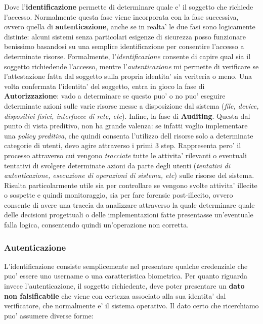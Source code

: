 Dove l'\textbf{identificazione} permette di determinare quale e' il soggetto che richiede l'accesso. Normalmente questa fase viene incorporata con la fase successiva, ovvero quella di \textbf{autenticazione}, anche se in realta' le due fasi sono logicamente distinte: alcuni sistemi senza particolari esigenze di sicurezza posso funzionare benissimo basandosi su una semplice identificazione per consentire l'accesso a determinate risorse. Formalmente, l'\emph{identificazione} consente di capire qual sia il soggetto richiedende l'accesso, mentre l'\emph{autenticazione} mi permette di verificare se l'attestazione fatta dal soggetto sulla propria identita' sia veriteria o meno. Una volta confermata l'identita' del soggetto, entra in gioco la fase di \textbf{Autorizzazione}: vado a determinare se questo puo' o no puo' eseguire determinate azioni sulle varie risorse messe a disposizione dal sistema (\emph{file, device, dispositivi fisici, interfacce di rete, etc}). 
Infine, la fase di \textbf{Auditing}. Questa dal punto di vista preditivo, non ha grande valenza: se infatti voglio implementare una \emph{policy preditiva}, che quindi consenta l'utilizzo dell risorse solo a determinate categorie di utenti, devo agire attraverso i primi 3 step. Rappresenta pero' il processo attraverso cui vengono \emph{tracciate} tutte le attivita' rilevanti o eventuali tentativi di svolgere determinate azioni da parte degli utenti (\emph{tentativi di autenticazione, esecuzione di operazioni di sistema, etc}) sulle risorse del sistema. Risulta particolarmente utile sia per controllare se vengono svolte attivita' illecite o sospette e quindi monitoraggio, sia per fare forensic post-illecito, ovvero consente di avere una traccia da analizzare attraverso la quale determinare quale delle decisioni progettuali o delle implementazioni fatte presentasse un'eventuale falla logica, consentendo quindi un'operazione non corretta.

\subsubsection{Autenticazione}
L'identificazione consiste semplicemente nel presentare qualche credenziale che puo' essere uno username o una caratteristica biometrica. Per quanto riguarda invece l'autenticazione, il soggetto richiedente, deve poter presentare un \textbf{dato non falsificabile} che viene con certezza associato alla sua identita' dal verificatore, che normalmente e' il sistema operativo. 
Il dato certo che ricerchiamo puo' assumere diverse forme:

